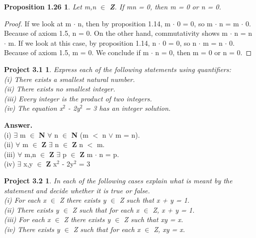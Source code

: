 \documentclass[12pt]{amsart}
\begin{document}
\newtheorem*{prop1.26}{Proposition 1.26}
\begin{prop1.26}
	Let m,n $\in$ \textbf{Z}. If mn = 0, then m = 0 or n = 0.
\end{prop1.26}

\begin{proof}
	If we look at m $\cdot$ n, then by proposition 1.14, m $\cdot$ 0 = 0, so m $\cdot$ n = m $\cdot$ 0. Because of axiom 1.5, n = 0. On the other hand, commutativity shows m $\cdot$ n = n $\cdot$ m. If we look at this case, by proposition 1.14, n $\cdot$ 0 = 0, so n $\cdot$ m = n $\cdot$ 0. Because of axiom 1.5, m = 0. We conclude if m $\cdot$ n = 0, then m = 0 or n = 0.
\end{proof}

\newtheorem*{proj3.1}{Project 3.1}
\begin{proj3.1}Express each of the following statements using quantifiers:
\\(i) There exists a smallest natural number.
\\(ii) There exists no smallest integer.
\\(iii) Every integer is the product of two integers.
\\(iv) The equation x$^{2}$ - 2y$^{2}$ = 3 has an integer solution.
\end{proj3.1}

\noindent
\textbf{Answer.}
\\(i) $\exists$ m $\in$ \textbf{N} $\forall$ n $\in$ \textbf{N} (m $<$ n $\vee$ m = n).
\\(ii) $\forall$ m $\in$ \textbf{Z} $\exists$ n $\in$ \textbf{Z} n $<$ m.
\\(iii) $\forall$ m,n $\in$ \textbf{Z} $\exists$ p $\in$ \textbf{Z} m $\cdot$ n = p.
\\(iv) $\exists$ x,y $\in$ \textbf{Z} x$^{2}$ - 2y$^{2}$ = 3
\newtheorem*{proj3.2}{Project 3.2}
\begin{proj3.2}
	In each of the following cases explain what is meant by the statement and decide whether it is true or false.
\\(i) For each x $\in$ Z there exists y $\in$ Z such that x + y = 1.
\\(ii) There exists y $\in$ Z such that for each x $\in$ Z, x + y = 1.
\\(iii) For each x $\in$ Z there exists y $\in$ Z such that xy = x.
\\(iv) There exists y $\in$ Z such that for each x $\in$ Z, xy = x.
\end{proj3.2}
\end{document}

